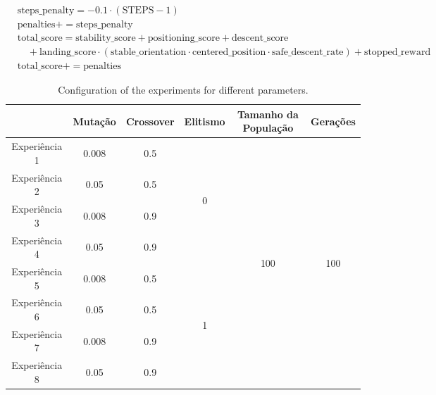 \documentclass[a4paper, 12pt, fleqn]{report}
\begin{document}
        {\scriptsize
        \begin{center}
        \begin{align*}
            & \text{steps\_penalty} = -0.1 \cdot (\text{STEPS} - 1) \\
            & \text{penalties} += \text{steps\_penalty} \\[0.5em]
            & \text{total\_score} =
            \text{stability\_score} +
            \text{positioning\_score} +
            \text{descent\_score} \\
            & \quad + \text{landing\_score} \cdot
            (\text{stable\_orientation} \cdot \text{centered\_position} \cdot \text{safe\_descent\_rate}) +
            \text{stopped\_reward} \\
            & \text{total\_score} += \text{penalties}
        \end{align*}
    \end{center}
        }
        
    

\begin{table}[H]
    \centering
    \begin{tabular}{|c|c|c|c|c|c|}
    \hline
    \textbf{} & \textbf{Mutação} & \textbf{Crossover} & \textbf{Elitismo} & \textbf{Tamanho da População} & \textbf{Gerações} \\
    \hline
    Experiência 1 & 0.008 & 0.5 & \multirow{4}{*}{0} & \multirow{8}{*}{100} & \multirow{8}{*}{100} \\
    \cline{1-3}
    Experiência 2 & 0.05 & 0.5 &  &  &  \\
    \cline{1-3}
    Experiência 3 & 0.008 & 0.9 &  &  &  \\
    \cline{1-3}
    Experiência 4 & 0.05 & 0.9 &  &  &  \\
    \cline{1-4}
    Experiência 5 & 0.008 & 0.5 & \multirow{4}{*}{1} &  &  \\
    \cline{1-3}
    Experiência 6 & 0.05 & 0.5 &  &  &  \\
    \cline{1-3}
    Experiência 7 & 0.008 & 0.9 &  &  &  \\
    \cline{1-3}
    Experiência 8 & 0.05 & 0.9 &  &  &  \\
    \hline
    \end{tabular}
    \caption{Configuration of the experiments for different parameters.}
    \end{table}
\end{document}
